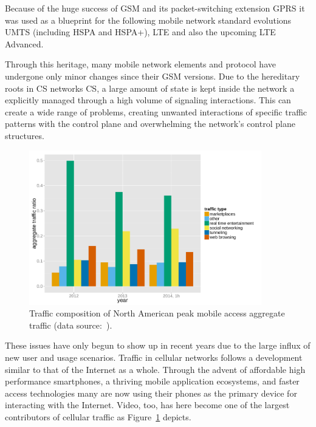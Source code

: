 Because of the huge success of \gls{GSM} and its packet-switching extension \gls{GPRS} it was used as a blueprint for the following mobile network standard evolutions \gls{UMTS} (including \gls{HSPA} and \gls{HSPA+}), \gls{LTE} and also the upcoming \gls{LTE} Advanced. 

Through this heritage, many mobile network elements and protocol have undergone only minor changes since their \gls{GSM} versions. Due to the hereditary roots in \gls{CS} networks \gls{CS}, a large amount of state is kept inside the network a explicitly managed through a high volume of signaling interactions. This can create a wide range of problems, creating unwanted interactions of specific traffic patterns with the control plane and overwhelming the network's control plane structures. 

\begin{figure}[htb]
	\centering
	\includegraphics[width=0.9\textwidth]{images/r-netvine-phenomena-mobile.pdf}
	\caption{Traffic composition of North American peak mobile access aggregate traffic (data source:~\cite{sandvine_internetphenomena}).}
\label{c1:fig:traffic-netvine-mobile}
\end{figure}

These issues have only begun to show up in recent years due to the large influx of new user and usage scenarios. Traffic in cellular networks follows a development similar to that of the Internet as a whole. Through the advent of affordable high performance smartphones, a thriving mobile application ecosystems, and faster access technologies many are now using their phones as the primary device for interacting with the Internet. Video, too, has here become one of the largest contributors of cellular traffic as Figure~\ref{c1:fig:traffic-netvine-mobile} depicts.

